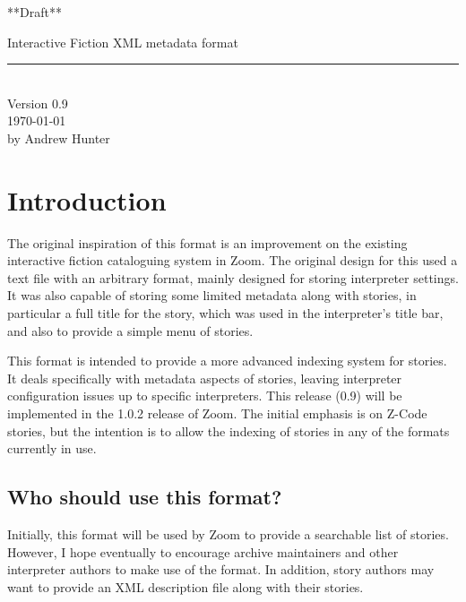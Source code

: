 \documentclass[a4paper,11pt]{article}
\begin{document}
\begin{titlepage}

\begin{flushright}
**Draft**
\end{flushright}

\rule{0cm}{6cm}

\begin{flushright}
\sst
Interactive Fiction XML metadata format\rm\\
\rule{16cm}{1.2mm}\\
Version 0.9\\
\today\\
by Andrew Hunter
\end{flushright}
\vfill

\end{titlepage}

\tableofcontents

\section{Introduction}

The original inspiration of this format is an improvement on the existing interactive fiction
cataloguing system in Zoom. The original design for this used a text file with an arbitrary
format, mainly designed for storing interpreter settings. It was also capable of storing
some limited metadata along with stories, in particular a full title for the story, which
was used in the interpreter's title bar, and also to provide a simple menu of stories.

This format is intended to provide a more advanced indexing system for stories. It
deals specifically with metadata aspects of stories, leaving interpreter configuration
issues up to specific interpreters. This release (0.9) will be implemented in the 1.0.2
release of Zoom. The initial emphasis is on Z-Code stories, but the intention is to allow
the indexing of stories in any of the formats currently in use.

\subsection{Who should use this format?}

Initially, this format will be used by Zoom to provide a searchable list of stories. However,
I hope eventually to encourage archive maintainers and other interpreter authors to make
use of the format. In addition, story authors may want to provide an XML description file
along with their stories.
\end{document}
